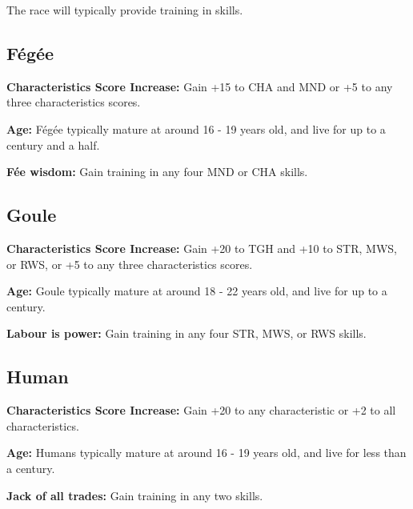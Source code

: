 \documentclass[]{article}
\begin{document}
The race will typically provide training in skills.

\subsection{Fégée}\label{fuxe9guxe9e}

\textbf{Characteristics Score Increase:} Gain +15 to CHA and MND or +5
to any three characteristics scores.

\textbf{Age:} Fégée typically mature at around 16 - 19 years old, and
live for up to a century and a half.

\textbf{Fée wisdom:} Gain training in any four MND or CHA skills.

\subsection{Goule}\label{goule}

\textbf{Characteristics Score Increase:} Gain +20 to TGH and +10 to STR,
MWS, or RWS, or +5 to any three characteristics scores.

\textbf{Age:} Goule typically mature at around 18 - 22 years old, and
live for up to a century.

\textbf{Labour is power:} Gain training in any four STR, MWS, or RWS
skills.

\subsection{Human}\label{human}

\textbf{Characteristics Score Increase:} Gain +20 to any characteristic
or +2 to all characteristics.

\textbf{Age:} Humans typically mature at around 16 - 19 years old, and
live for less than a century.

\textbf{Jack of all trades:} Gain training in any two skills.
\end{document}
